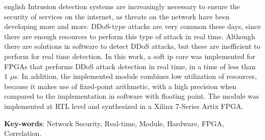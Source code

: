\begin{resumo}[Abstract]
 \begin{otherlanguage*}{english}
 	 Intrusion detection systems are increasingly necessary to ensure the security of services on the internet, as threats on the network have been developing more and more. DDoS-type attacks are very common these days, since there are enough resources to perform this type of attack in real time. Although there are solutions in software to detect DDoS attacks, but these are inefficient to perform for real time detection. In this work, a soft ip core was implemented for FPGAs that performs DDoS attack detection in real time, in a time of less than 1 $\mu$s. In addition, the implemented module combines low utilization of resources, because it makes use of fixed-point arithmetic, with a high precision when compared to the implementation in software with floating point. The module was implemented at RTL level and synthesized in a Xilinx 7-Series Artix FPGA.
   \noindent 
  
   \textbf{Key-words}: Network Security, Real-time, Module,
   Hardware, FPGA, Correlation. 
 \end{otherlanguage*}
\end{resumo}